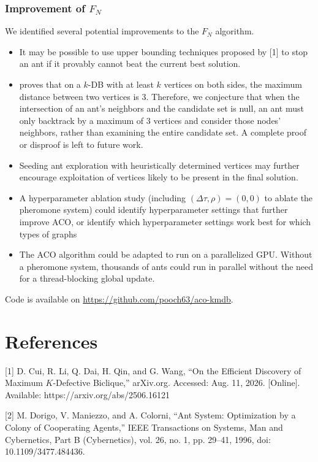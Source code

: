 \documentclass[conference]{IEEEtran}
\begin{document}
\subsubsection{Improvement of $F_N$}


We identified several potential improvements to the $F_N$ algorithm.


\begin{itemize}
   \item It may be possible to use upper bounding techniques proposed by [1] to stop an ant if it provably cannot beat the current best solution.
   \item [1] proves that on a $k$-DB with at least $k$ vertices on both sides, the maximum distance between two vertices is 3. Therefore, we conjecture that when the intersection of an ant's neighbors and the candidate set is null, an ant must only backtrack by a maximum of 3 vertices and consider those nodes' neighbors, rather than examining the entire candidate set. A complete proof or disproof is left to future work.
   \item Seeding ant exploration with heuristically determined vertices may further encourage exploitation of vertices likely to be present in the final solution.
   \item A hyperparameter ablation study (including $(\Delta\tau, \rho) = (0, 0)$ to ablate the pheromone system) could identify hyperparameter settings that further improve ACO, or identify which hyperparameter settings work best for which types of graphs
   \item The ACO algorithm could be adapted to run on a parallelized GPU. Without a pheromone system, thousands of ants could run in parallel without the need for a thread-blocking global update.
\end{itemize}


Code is available on \url{https://github.com/pooch63/aco-kmdb}.


\section*{References}


[1] D. Cui, R. Li, Q. Dai, H. Qin, and G. Wang, “On the Efficient Discovery of Maximum $K$-Defective Biclique,” arXiv.org. Accessed: Aug. 11, 2026. [Online]. Available: https://arxiv.org/abs/2506.16121
\


[2]
M. Dorigo, V. Maniezzo, and A. Colorni, “Ant System: Optimization by a Colony of Cooperating Agents,” IEEE Transactions on Systems, Man and Cybernetics, Part B (Cybernetics), vol. 26, no. 1, pp. 29–41, 1996, doi: 10.1109/3477.484436.
\
\end{document}
